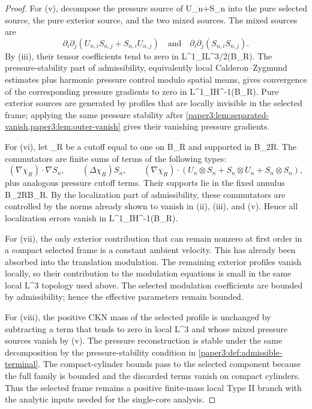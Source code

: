 \documentclass[11pt]{amsart}
\def\({}%
\def\){}%
\theoremstyle{plain}
\theoremstyle{definition}
\theoremstyle{remark}
\begin{document}
\begin{proof}
For \((v)\), decompose the pressure source of \(U_n+S_n\) into the pure selected
source, the pure exterior source, and the two mixed sources.  The mixed sources
are
\[
  \partial_i\partial_j(U_{n,i}S_{n,j}+S_{n,i}U_{n,j})
  \quad\text{and}\quad
  \partial_i\partial_j(S_{n,i}S_{n,j}).
\]
By \((iii)\), their tensor coefficients tend to zero in
\(L^1_IL^{3/2}(B_R)\).  The pressure-stability part of admissibility,
equivalently local Calderon--Zygmund estimates plus harmonic pressure control
modulo spatial means, gives convergence of the corresponding pressure gradients
to zero in \(L^1_IH^{-1}(B_R)\).  Pure exterior sources are generated by
profiles that are locally invisible in the selected frame; applying the same
pressure stability after \cref{paper3:lem:separated-vanish,paper3:lem:outer-vanish} gives
their vanishing pressure gradients.

For \((vi)\), let \(\chi_R\) be a cutoff equal to one on \(B_R\) and supported
in \(B_{2R}\).  The commutators are finite sums of terms of the following
types:
\[
  (\nabla\chi_R)\cdot\nabla S_n,
  \qquad
  (\Delta\chi_R)S_n,
  \qquad
  (\nabla\chi_R)\cdot (U_n\otimes S_n+S_n\otimes U_n+S_n\otimes S_n),
\]
plus analogous pressure cutoff terms.  Their supports lie in the fixed annulus
\(B_{2R}\setminus B_R\).  By the localization part of admissibility, these
commutators are controlled by the norms already shown to vanish in \((ii)\),
\((iii)\), and \((v)\).  Hence all localization errors vanish in
\(L^1_IH^{-1}(B_R)\).

For \((vii)\), the only exterior contribution that can remain nonzero at first
order in a compact selected frame is a constant ambient velocity.  This has
already been absorbed into the translation modulation.  The remaining exterior
profiles vanish locally, so their contribution to the modulation equations is
small in the same local \(L^3\) topology used above.  The selected modulation
coefficients are bounded by admissibility; hence the effective parameters remain
bounded.

For \((viii)\), the positive CKN mass of the selected profile is unchanged by
subtracting a term that tends to zero in local \(L^3\) and whose
mixed pressure sources vanish by \((v)\).  The pressure reconstruction is stable
under the same decomposition by the pressure-stability condition in
\cref{paper3:def:admissible-terminal}.  The compact-cylinder bounds pass to the
selected component because the full family is bounded and the discarded terms
vanish on compact cylinders.  Thus the selected frame remains a positive
finite-mass local Type II branch with the analytic inputs needed for the
single-core analysis.
\end{proof}
\end{document}
